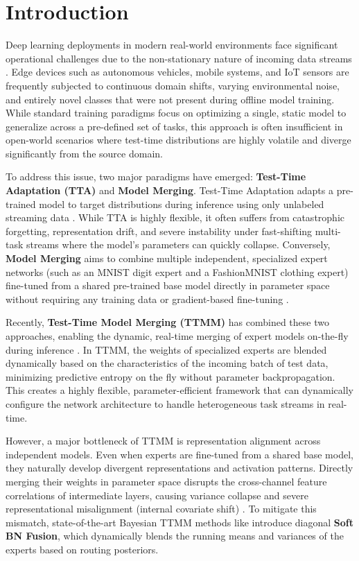 \documentclass{article}
\begin{document}
\printAffiliationsAndNotice{}

\section{Introduction}
\label{sec:intro}

Deep learning deployments in modern real-world environments face significant operational challenges due to the non-stationary nature of incoming data streams \cite{wang20, wang22}. Edge devices such as autonomous vehicles, mobile systems, and IoT sensors are frequently subjected to continuous domain shifts, varying environmental noise, and entirely novel classes that were not present during offline model training. While standard training paradigms focus on optimizing a single, static model to generalize across a pre-defined set of tasks, this approach is often insufficient in open-world scenarios where test-time distributions are highly volatile and diverge significantly from the source domain. 

To address this issue, two major paradigms have emerged: \textbf{Test-Time Adaptation (TTA)} and \textbf{Model Merging}. Test-Time Adaptation adapts a pre-trained model to target distributions during inference using only unlabeled streaming data \cite{wang20, niu22}. While TTA is highly flexible, it often suffers from catastrophic forgetting, representation drift, and severe instability under fast-shifting multi-task streams where the model's parameters can quickly collapse. Conversely, \textbf{Model Merging} aims to combine multiple independent, specialized expert networks (such as an MNIST digit expert and a FashionMNIST clothing expert) fine-tuned from a shared pre-trained base model directly in parameter space without requiring any training data or gradient-based fine-tuning \cite{matena21, ainsworth22, jordan22, stoica23}. 

Recently, \textbf{Test-Time Model Merging (TTMM)} has combined these two approaches, enabling the dynamic, real-time merging of expert models on-the-fly during inference \cite{clw_fisher25, kt_fisher25, df_bayes_ttmm25}. In TTMM, the weights of specialized experts are blended dynamically based on the characteristics of the incoming batch of test data, minimizing predictive entropy on the fly without parameter backpropagation. This creates a highly flexible, parameter-efficient framework that can dynamically configure the network architecture to handle heterogeneous task streams in real-time.

However, a major bottleneck of TTMM is representation alignment across independent models. Even when experts are fine-tuned from a shared base model, they naturally develop divergent representations and activation patterns. Directly merging their weights in parameter space disrupts the cross-channel feature correlations of intermediate layers, causing variance collapse and severe representational misalignment (internal covariate shift) \cite{jordan22}. To mitigate this mismatch, state-of-the-art Bayesian TTMM methods like \cite{df_bayes_ttmm25} introduce diagonal \textbf{Soft BN Fusion}, which dynamically blends the running means and variances of the experts based on routing posteriors. 
\end{document}
